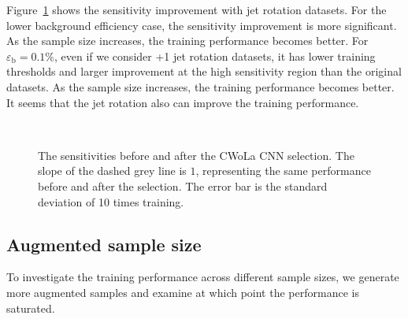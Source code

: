 \documentclass[12pt]{article}
\begin{document}
		Figure~\ref{fig:sensitivity_improvement_origin_jet_aug_1_3_5} shows the sensitivity improvement with jet rotation datasets. For the lower background efficiency case, the sensitivity improvement is more significant. As the sample size increases, the training performance becomes better. For $\varepsilon_{\text{b}} = 0.1 \%$, even if we consider +1 jet rotation datasets, it has lower training thresholds and larger improvement at the high sensitivity region than the original datasets. As the sample size increases, the training performance becomes better. It seems that the jet rotation also can improve the training performance.
		\begin{figure}[htpb]
			\centering
			 \\
			\caption{The sensitivities before and after the CWoLa CNN selection. The slope of the dashed grey line is $1$, representing the same performance before and after the selection. The error bar is the standard deviation of 10 times training.}
			\label{fig:sensitivity_improvement_origin_jet_aug_1_3_5}
		\end{figure}
	\subsection{Augmented sample size}%
	\label{sub:augmented_sample_size}
		To investigate the training performance across different sample sizes, we generate more augmented samples and examine at which point the performance is saturated.
\end{document}
